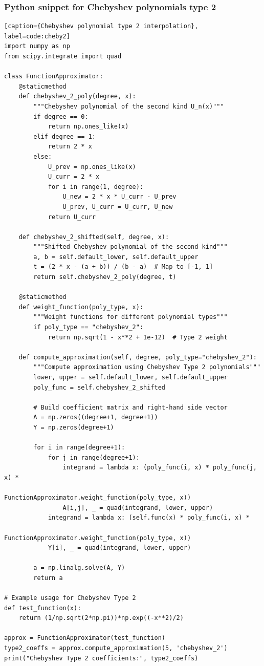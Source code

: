 \documentclass[10pt]{article}
\begin{document}
\subsubsection{Python snippet for Chebyshev polynomials type 2}
\begin{lstlisting}[style=custompython][caption={Chebyshev polynomial type 2 interpolation}, label=code:cheby2]
import numpy as np
from scipy.integrate import quad

class FunctionApproximator:
    @staticmethod
    def chebyshev_2_poly(degree, x):
        """Chebyshev polynomial of the second kind U_n(x)"""
        if degree == 0:
            return np.ones_like(x)
        elif degree == 1:
            return 2 * x
        else:
            U_prev = np.ones_like(x)
            U_curr = 2 * x
            for i in range(1, degree):
                U_new = 2 * x * U_curr - U_prev
                U_prev, U_curr = U_curr, U_new
            return U_curr

    def chebyshev_2_shifted(self, degree, x):
        """Shifted Chebyshev polynomial of the second kind"""
        a, b = self.default_lower, self.default_upper
        t = (2 * x - (a + b)) / (b - a)  # Map to [-1, 1]
        return self.chebyshev_2_poly(degree, t)

    @staticmethod
    def weight_function(poly_type, x):
        """Weight functions for different polynomial types"""
        if poly_type == "chebyshev_2":
            return np.sqrt(1 - x**2 + 1e-12)  # Type 2 weight

    def compute_approximation(self, degree, poly_type="chebyshev_2"):
        """Compute approximation using Chebyshev Type 2 polynomials"""
        lower, upper = self.default_lower, self.default_upper
        poly_func = self.chebyshev_2_shifted

        # Build coefficient matrix and right-hand side vector
        A = np.zeros((degree+1, degree+1))
        Y = np.zeros(degree+1)

        for i in range(degree+1):
            for j in range(degree+1):
                integrand = lambda x: (poly_func(i, x) * poly_func(j, x) * 
                                      FunctionApproximator.weight_function(poly_type, x))
                A[i,j], _ = quad(integrand, lower, upper)
            integrand = lambda x: (self.func(x) * poly_func(i, x) *
                                  FunctionApproximator.weight_function(poly_type, x))
            Y[i], _ = quad(integrand, lower, upper)

        a = np.linalg.solve(A, Y)
        return a

# Example usage for Chebyshev Type 2
def test_function(x):
    return (1/np.sqrt(2*np.pi))*np.exp((-x**2)/2)

approx = FunctionApproximator(test_function)
type2_coeffs = approx.compute_approximation(5, 'chebyshev_2')
print("Chebyshev Type 2 coefficients:", type2_coeffs)
\end{lstlisting}
\end{document}
